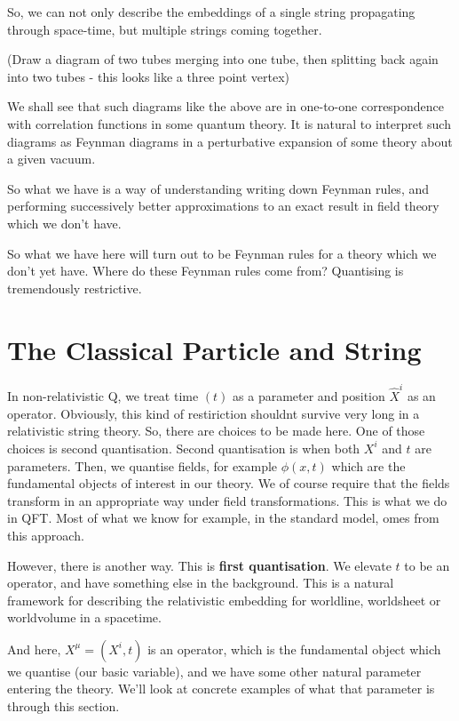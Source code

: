 \documentclass[11pt, oneside]{article}   	%
\theoremstyle{slanted}
\begin{document}
So, we can not only describe the embeddings 
of a single string propagating through space-time, 
but multiple strings coming together. 

(Draw a diagram of two tubes merging into one tube, 
then splitting back again into two tubes - this looks like 
a three point vertex)

We shall see that such diagrams like the above 
are in one-to-one 
correspondence with correlation functions in some 
quantum theory. 
It is natural to interpret such diagrams 
as Feynman diagrams in a perturbative expansion 
of some theory about a given vacuum. 

So what we have is a way of understanding 
writing down Feynman rules, and performing 
successively better approximations to 
an exact result in field theory which we don't have. 

So what we have here will turn out to be Feynman rules for a theory 
which we don't yet have. Where do these Feynman rules come from? 
Quantising is tremendously restrictive. 


\section{The Classical Particle and String}
In non-relativistic Q, we treat 
time $ \left( t  \right)  $ as a parameter 
and position $ \hat{ X } ^ i $ as an operator. 
Obviously, this kind of restiriction shouldnt 
survive very long in a relativistic string theory. 
So, there are choices to be made here. 
One of those choices is second quantisation.
Second quantisation is when both $ X ^ i $ and $ t $ 
are parameters. Then, 
we quantise fields, for example $ \phi \left( x, t  \right)  $ 
which are the fundamental objects of interest in our 
theory. 
We of course require that the fields 
transform in an appropriate way under field transformations. 
This is what we do in QFT. Most of what we know for example, 
in the standard model, omes from this approach. 

However, there is another way. 
This is \textbf{first quantisation}. 
We elevate $ t $ to be an operator, 
and have something else in the background. 
This is a natural framework for 
describing the relativistic 
embedding for worldline, worldsheet
or worldvolume 
in a spacetime.

And here, $ X ^ \mu  = \left( X ^ i , t  \right)   $ 
is an operator, which is the fundamental 
object which we quantise (our basic variable), 
and we have some other natural parameter 
entering the theory. 
We'll look at concrete examples of what that parameter 
is through this section. 
\end{document}
